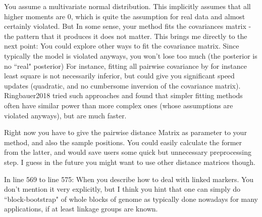 \begin{point}{}
     You assume a multivariate normal distribution. 
 This implicitly assumes that all higher moments are 0, 
 which is quite the assumption for real data and almost certainly violated. 
 But In some sense, your method fits the covariances matrix - the pattern that it produces it does not matter. 
 This brings me directly to the next point:
 You could explore other ways to fit the covariance matrix. 
 Since typically the model is violated anyways, 
 you won't lose too much (the posterior is no ``real" posterior)
For instance, fitting all pairwise covariance by for instance least square 
is not necessarily inferior, but could give you significant speed updates 
(quadratic, and no cumbersome inversion of the covariance matrix).
Ringbauer2018 tried such approaches and found 
that simpler fitting methods often have similar power than more complex ones 
(whose assumptions are violated anyways), but are much faster.
\end{point}


\begin{point}{}
    Right now you have to give the pairwise distance Matrix as parameter to your method, 
and also the sample positions. 
You could easily calculate the former from the latter, 
and would save users some quick but unnecessary preprocessing step. 
I guess in the future you might want to use other distance matrices though.
\end{point}


\begin{point}{}
    In line 569 to line 575: When you describe how to deal with linked markers. 
You don't mention it very explicitly, 
but I think you hint that one can simply do ``block-bootstrap" of whole blocks of genome 
as typically done nowadays for many applications, 
if at least linkage groups are known.
\end{point}

